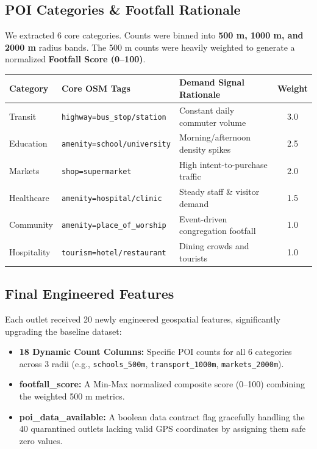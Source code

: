 \documentclass[11pt, a4paper]{article}
\begin{document}
\subsection{POI Categories \& Footfall Rationale}

We extracted 6 core categories. Counts were binned into \textbf{500 m, 1000 m,
and 2000 m} radius bands. The 500 m counts were heavily weighted to generate a
normalized \textbf{Footfall Score (0--100)}.

\begin{center}
\small
\begin{tabularx}{\linewidth}{l l X c}
  \toprule
  \textbf{Category} & \textbf{Core OSM Tags} & \textbf{Demand Signal Rationale} & \textbf{Weight} \\
  \midrule
  Transit     & \texttt{highway=bus\_stop/station} & Constant daily commuter volume & 3.0 \\
  Education   & \texttt{amenity=school/university} & Morning/afternoon density spikes & 2.5 \\
  Markets     & \texttt{shop=supermarket}          & High intent-to-purchase traffic & 2.0 \\
  Healthcare  & \texttt{amenity=hospital/clinic}   & Steady staff \& visitor demand & 1.5 \\
  Community   & \texttt{amenity=place\_of\_worship}& Event-driven congregation footfall & 1.0 \\
  Hospitality & \texttt{tourism=hotel/restaurant}  & Dining crowds and tourists & 1.0 \\
  \bottomrule
\end{tabularx}
\end{center}

\subsection{Final Engineered Features}

Each outlet received 20 newly engineered geospatial features, significantly
upgrading the baseline dataset:
\begin{itemize}[noitemsep, topsep=2pt]
  \item \textbf{18 Dynamic Count Columns:} Specific POI counts for all 6 categories
        across 3 radii (e.g., \texttt{schools\_500m}, \texttt{transport\_1000m},
        \texttt{markets\_2000m}).
  \item \textbf{footfall\_score:} A Min-Max normalized composite score (0--100)
        combining the weighted 500 m metrics.
  \item \textbf{poi\_data\_available:} A boolean data contract flag gracefully
        handling the 40 quarantined outlets lacking valid GPS coordinates by
        assigning them safe zero values.
\end{itemize}
\end{document}
